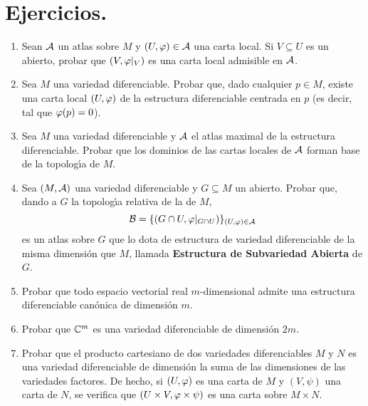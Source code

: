 \documentclass[cursovd_portada.tex]{subfiles}
\begin{document}
\section{Ejercicios.}
\begin{enumerate}
\item Sean ${\cal A}$ un atlas sobre $M$ y $(U,\varphi)\in{\cal A}$ una
carta local. Si $V\subseteq U$ es un abierto, probar que
$(V,\varphi|_V)$ es una carta local admisible en ${\cal A}$. \item Sea
$M$ una variedad diferenciable. Probar que, dado cualquier $p\in
M$, existe una carta local $(U,\varphi)$ de la estructura
diferenciable centrada en $p$ (es decir, tal que $\varphi(p)=0$).
\item Sea $M$ una variedad diferenciable y ${\cal A}$ el atlas
maximal de la estructura diferenciable. Probar que los dominios de
las cartas locales de ${\cal A}$ forman base de la topolog\'{\i}a
de $M$. \item Sea $(M,{\cal A})$ una variedad diferenciable y
$G\subseteq M$ un abierto. Probar que, dando a $G$ la
topolog\'{\i}a relativa de la de $M$,
$${\cal B}=\{(G\cap U,\varphi|_{G\cap U})\}_{(U,\varphi)\in{\cal A}}$$
es un atlas sobre $G$ que lo dota de estructura de variedad
diferenciable de la misma dimensi\'{o}n que $M$, llamada {\bf
Estructura de Subvariedad Abierta} de $G$. \item Probar que todo
espacio vectorial real $m$-dimensional admite una estructura
diferenciable can\'{o}nica de dimensi\'{o}n $m$. \item Probar que
$\mathbb{C}^m$ es una variedad diferenciable de dimensi\'{o}n $2m$. \item
Probar que el producto cartesiano de dos variedades diferenciables
$M$ y $N$ es una variedad diferenciable de dimensi\'{o}n la suma
de las dimensiones de las variedades factores. De hecho, si
$(U,\varphi)$ es una carta de $M$ y $(V,\psi)$ una carta de $N$, se
verifica que $(U\times V,\varphi\times\psi)$ es una carta sobre
$M\times N$.
\end{enumerate}
\end{document}
